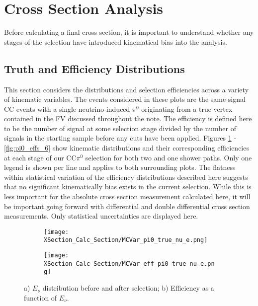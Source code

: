 \clearpage
\section{Cross Section Analysis}
Before calculating a final cross section, it is important to understand whether any stages of the selection have introduced kinematical bias into the analysis.  

\subsection{Truth and Efficiency Distributions}
This section considers the distributions and selection efficiencies across a variety of kinematic variables.  The events considered in these plots are the same signal CC events with a single neutrino-induced $\pi^0$ originating from a true vertex contained in the FV discussed throughout the note. The efficiency is defined here to be the number of signal at some selection stage divided by the number of signals in the starting sample before any cuts have been applied.  Figures \ref{fig:pi0_effs_0} - \ref{fig:pi0_effs_6} show kinematic distributions and their corresponding efficiencies at each stage of our CC$\pi^0$ selection for both two and one shower paths. Only one legend is shown per line and applies to both surrounding plots.  The flatness within statistical variation of the efficiency distributions described here suggests that no significant kinematically bias exists in the current selection. While this is less important for the absolute cross section measurement calculated here, it will be important going forward with differential and double differential cross section measurements. Only statistical uncertainties are displayed here. 

\begin{figure}[H]
 \begin{subfigure}[t]{0.35\textwidth}
    \texttt{[image: XSection\_Calc\_Section/MCVar\_pi0\_true\_nu\_e.png]}
  \caption{ }
  \end{subfigure} 
  \hspace{15mm}
  \begin{subfigure}[t]{0.35\textwidth}
\texttt{[image: XSection\_Calc\_Section/MCVar\_eff\_pi0\_true\_nu\_e.png]}
  \caption{ }
  \end{subfigure} 
\caption{a) $E_\nu$ distribution before and after selection; b) Efficiency as a function of $E_\nu$. }
\label{fig:pi0_effs_0}
\end{figure}

